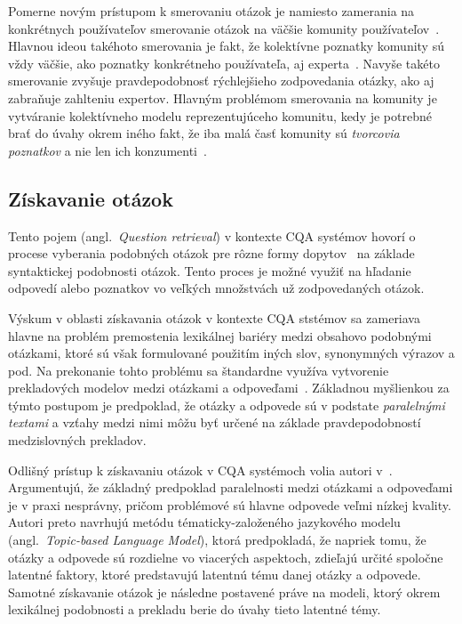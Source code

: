Pomerne novým prístupom k smerovaniu otázok je namiesto zamerania na konkrétnych používateľov smerovanie otázok na väčšie
komunity používateľov~\cite{Liu2014}. Hlavnou ideou takéhoto smerovania je fakt, že kolektívne poznatky komunity sú vždy väčšie, ako
poznatky konkrétneho používateľa, aj experta~\cite{Pal2013}. Navyše takéto smerovanie zvyšuje pravdepodobnosť rýchlejšieho zodpovedania
otázky, ako aj zabraňuje zahlteniu expertov. Hlavným problémom smerovania na komunity je vytváranie kolektívneho modelu
reprezentujúceho komunitu, kedy je potrebné brať do úvahy okrem iného fakt, že iba malá časť komunity sú \emph{tvorcovia
poznatkov} a nie len ich konzumenti~\cite{Pal2015}.


\subsection{Získavanie otázok}\label{q:retr}

Tento pojem (angl.~\emph{Question retrieval}) v kontexte CQA systémov hovorí o procese vyberania podobných otázok pre
rôzne formy dopytov~\cite{Zhang2014} na základe syntaktickej podobnosti otázok.
Tento proces je možné využiť na hľadanie odpovedí alebo poznatkov vo veľkých množstvách už zodpovedaných otázok.

Výskum v oblasti získavania otázok v kontexte CQA ststémov sa zameriava hlavne na problém premostenia lexikálnej bariéry medzi
obsahovo podobnými otázkami, ktoré sú však formulované použitím iných slov, synonymných výrazov a pod. Na prekonanie
tohto problému sa štandardne využíva vytvorenie prekladových modelov medzi otázkami a odpoveďami~\cite{Cao2010}.
Základnou myšlienkou za týmto postupom je predpoklad, že otázky a odpovede sú v podstate \emph{paralelnými textami}
a vzťahy medzi nimi môžu byť určené na základe pravdepodobností medzislovných prekladov.

Odlišný prístup k získavaniu otázok v CQA systémoch volia autori v~\cite{Zhang2014}. Argumentujú, že základný predpoklad
paralelnosti medzi otázkami a odpoveďami je v praxi nesprávny, pričom problémové sú hlavne odpovede veľmi nízkej kvality.
Autori preto navrhujú metódu tématicky-založeného jazykového modelu (angl.~\emph{Topic-based Language Model}), ktorá
predpokladá, že napriek tomu, že otázky a odpovede sú rozdielne vo viacerých aspektoch, zdieľajú určité
spoločne latentné faktory, ktoré predstavujú latentnú tému danej otázky a odpovede. Samotné získavanie otázok je následne
postavené práve na modeli, ktorý okrem lexikálnej podobnosti a prekladu berie do úvahy tieto latentné témy.


